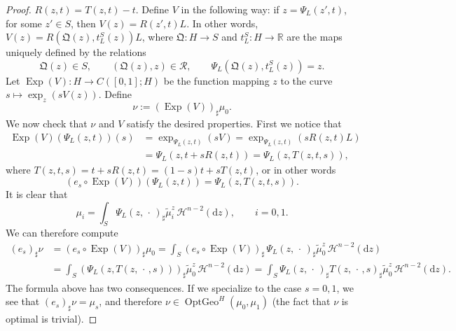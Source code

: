 \documentclass[12pt,a4paper]{amsart}
\theoremstyle{plain}
\theoremstyle{definition}
\numberwithin{equation}{section}
\newcommand{\R}{\mathbb{R}}
\DeclareMathOperator{\Exp}{Exp}
\DeclareMathOperator{\OptGeo}{OptGeo}
\newcommand{\de}{{\mathrm{d}}}
\newcommand{\haus}{\mathcal{H}}
\newcommand{\dotargument}{\,\cdot\,}
\newcommand{\QQ}{\mathfrak Q}
\newcommand{\gflow}{\Psi}
\newcommand{\relation}{\mathcal{R}}
\begin{document}
\begin{proof}
  $R(z,t)=T(z,t)-t$.
  Define $V$ in the following way: if $z=\gflow_L(z',t)$, for some
  $z'\in S$, then $V(z)=R(z',t) L$.
  In other words, $V(z)=R(\QQ(z),t_L^S(z)) L$, where $\QQ:H\to S$ and
  $t_L^S:H\to \R$ are the maps uniquely defined by the relations
  \begin{equation}
    \QQ(z)\in S,
    \qquad
    (\QQ(z),z)\in\relation,
    \qquad
    \gflow_L(\QQ(z),t_L^S(z))=z
    .
  \end{equation}
  Let $\Exp(V):H\to C([0,1];H)$ be the function mapping  $z$ to the
  curve $s\mapsto \exp_z(sV(z))$.
  Define $$\nu:=(\Exp(V))_{\sharp}\mu_0.$$
  We now check that $\nu$ and $V$ satisfy the desired properties.
  First we notice that
  \begin{align*}
    \Exp(V)(\gflow_L(z,t))(s)
    &
      =
      \exp_{\gflow_L(z,t)}(sV)
      =
      \exp_{\gflow_L(z,t)}(sR(z,t) L)
    \\&
      =
      \gflow_L(z,t+s R(z,t))
      =
    \gflow_L(z,T(z,t,s))
    ,
  \end{align*}
  where $T(z,t,s)=t+sR(z,t)=(1-s)t + sT(z,t)$, or in other words
  $$(e_s\circ \Exp(V))(\gflow_L(z,t))=    \gflow_L(z,T(z,t,s)).$$
  It is clear that
  \begin{equation}
    \mu_i
    =
    \int_S
    \gflow_L(z,\dotargument)_{\sharp} \tilde\mu_i^z
    \,
    \haus^{n-2}(\de z)
    ,
    \qquad
    i=0,1
    .
  \end{equation}
  We can therefore compute
  \begin{equation}
    \label{eq:monotone-interpolation}
    \begin{aligned}
    (e_s)_{\sharp}\nu
    &
    =
      (e_s\circ\Exp(V))_{\sharp}
      \mu_0
    =
    \int_S
    (e_s\circ\Exp(V))_{\sharp} \,\gflow_L(z,\dotargument)_{\sharp} \tilde\mu_0^z
    \,
    \haus^{n-2}(\de z)
    \\
    &
          =
    \int_S
      (\gflow_L(z,T(z,\dotargument,s)))_\sharp
      \tilde\mu_0^z
    \,
      \haus^{n-2}(\de z)
           =
    \int_S
      \gflow_L(z,\dotargument)_{\sharp} T(z,\dotargument,s)_\sharp
      \tilde\mu_0^z
    \,
      \haus^{n-2}(\de z)
      .
  \end{aligned}
  \end{equation}
  The formula above has two consequences.
  If we specialize to the case $s=0,1$, we see that $(e_s)_{\sharp}\nu=\mu_s$,
  and therefore $\nu\in\OptGeo^H(\mu_0,\mu_1)$ (the fact that
  $\nu$ is optimal is trivial).

\end{proof}
\end{document}
